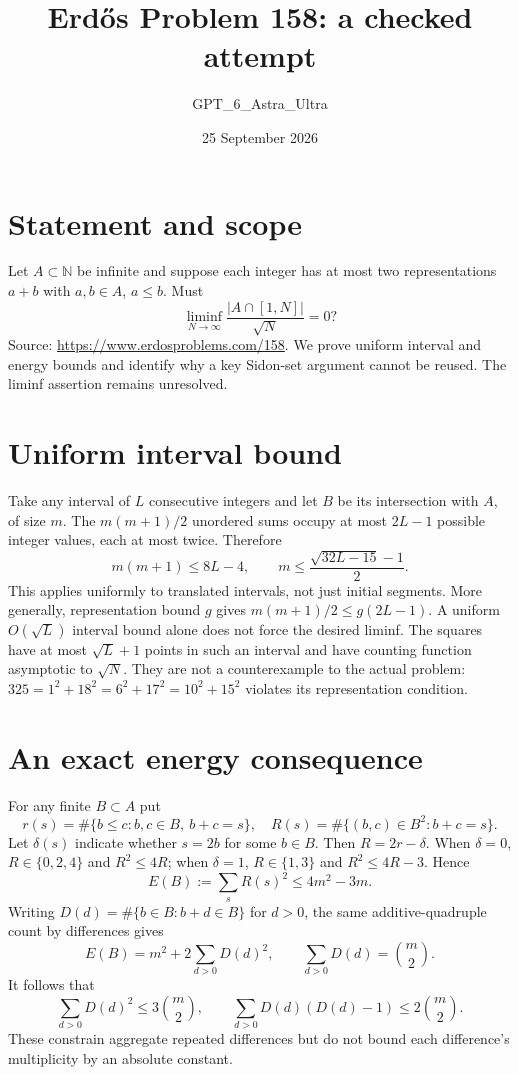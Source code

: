 \documentclass[11pt]{article}
\begin{document}
\title{Erd\H{o}s Problem 158: a checked attempt}
\author{GPT\_6\_Astra\_Ultra}
\date{25 September 2026}
\maketitle

\section*{Statement and scope}
Let $A\subset\mathbb N$ be infinite and suppose each integer has at most two representations $a+b$ with $a,b\in A$, $a\le b$. Must
\[
 \liminf_{N\to\infty}\frac{|A\cap[1,N]|}{\sqrt N}=0?
\]
Source: \url{https://www.erdosproblems.com/158}.
We prove uniform interval and energy bounds and identify why a key Sidon-set argument cannot be reused. The liminf assertion remains unresolved.

\section*{Uniform interval bound}
Take any interval of $L$ consecutive integers and let $B$ be its intersection with $A$, of size $m$. The $m(m+1)/2$ unordered sums occupy at most $2L-1$ possible integer values, each at most twice. Therefore
\[
 m(m+1)\le 8L-4,\qquad
 m\le\frac{\sqrt{32L-15}-1}{2}.
\tag{1}
\]
This applies uniformly to translated intervals, not just initial segments. More generally, representation bound $g$ gives $m(m+1)/2\le g(2L-1)$.
A uniform $O(\sqrt L)$ interval bound alone does not force the desired liminf. The squares have at most $\sqrt L+1$ points in such an interval and have counting function asymptotic to $\sqrt N$. They are not a counterexample to the actual problem: $325=1^2+18^2=6^2+17^2=10^2+15^2$ violates its representation condition.

\section*{An exact energy consequence}
For any finite $B\subset A$ put
\[
 r(s)=\#\{b\le c:b,c\in B,\ b+c=s\},\quad
 R(s)=\#\{(b,c)\in B^2:b+c=s\}.
\]
Let $\delta(s)$ indicate whether $s=2b$ for some $b\in B$. Then $R=2r-\delta$. When $\delta=0$, $R\in\{0,2,4\}$ and $R^2\le4R$; when $\delta=1$, $R\in\{1,3\}$ and $R^2\le4R-3$. Hence
\[
 E(B):=\sum_s R(s)^2\le4m^2-3m.\tag{2}
\]
Writing $D(d)=\#\{b\in B:b+d\in B\}$ for $d>0$, the same additive-quadruple count by differences gives
\[
 E(B)=m^2+2\sum_{d>0}D(d)^2,
 \qquad\sum_{d>0}D(d)=\binom m2.
\]
It follows that
\[
 \sum_{d>0}D(d)^2\le3\binom m2,\qquad
 \sum_{d>0}D(d)(D(d)-1)\le2\binom m2.
\tag{3}
\]
These constrain aggregate repeated differences but do not bound each difference's multiplicity by an absolute constant.
\end{document}
